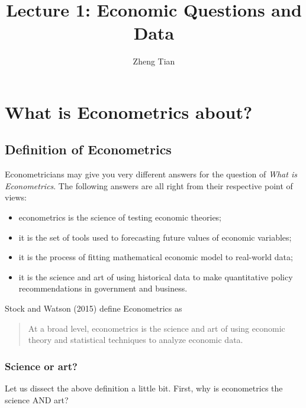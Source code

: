 \documentclass[a4paper,11pt]{article}
\author{Zheng Tian}
\date{}
\title{Lecture 1: Economic Questions and Data}
\begin{document}
\maketitle
\setcounter{tocdepth}{1}
\tableofcontents


\section{What is Econometrics about?}
\label{sec:orgdb3a57b}

\subsection{Definition of Econometrics}
\label{sec:orga8c46fb}

Econometricians may give you very different answers for the question
of \emph{What is Econometrics}. The following answers are all right from
their respective point of views:
\begin{itemize}
\item econometrics is the science of testing economic theories;
\item it is the set of tools used to forecasting future values
of economic variables;
\item it is the process of fitting mathematical economic model
to real-world data;
\item it is the science and art of using historical data to make
quantitative policy recommendations in government and business.
\end{itemize}

Stock and Watson (2015) define Econometrics as
\begin{quote}
At a broad level, econometrics is the science and art of using
economic theory and statistical techniques to analyze economic
data.
\end{quote}

\subsubsection*{Science or art?}
\label{sec:org6bb18d0}

Let us dissect the above definition a little bit. First, why is
econometrics the science AND art?
\end{document}
